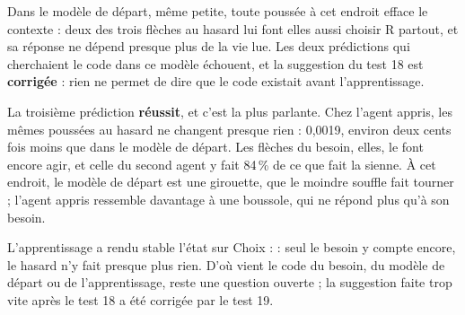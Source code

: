 \documentclass[fontsize=10pt,paper=a4,parskip=half-]{scrartcl}
\newcommand{\q}[1]{\og #1\fg{}}
\newcommand{\pc}{\,\%}
\begin{document}
Dans le modèle de départ, même petite, toute poussée à cet endroit efface le contexte : deux des
trois flèches au hasard lui font elles aussi choisir R partout, et sa réponse ne dépend presque
plus de la vie lue. Les deux prédictions qui cherchaient le code dans ce modèle échouent, et la
suggestion du test 18 est \textbf{corrigée} : rien ne permet de dire que le code existait avant
l'apprentissage.

La troisième prédiction \textbf{réussit}, et c'est la plus parlante. Chez l'agent appris, les
mêmes poussées au hasard ne changent presque rien : 0,0019, environ deux cents fois moins que
dans le modèle de départ. Les flèches du besoin, elles, le font encore agir, et celle du second
agent y fait 84\pc{} de ce que fait la sienne. À cet endroit, le modèle de départ est une
girouette, que le moindre souffle fait tourner ; l'agent appris ressemble davantage à une
boussole, qui ne répond plus qu'à son besoin.

\begin{essentiel}
L'apprentissage a rendu stable l'état sur \q{Choix :} : seul le besoin y compte encore, le
hasard n'y fait presque plus rien. D'où vient le code du besoin, du modèle de départ ou de
l'apprentissage, reste une question ouverte ; la suggestion faite trop vite après le test 18
a été corrigée par le test 19.
\end{essentiel}
\end{document}
